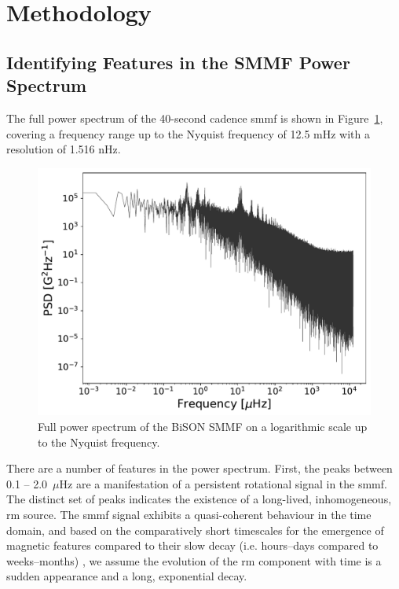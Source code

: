 \section{Methodology}\label{sec:SMMF_method}


\subsection{Identifying Features in the SMMF Power Spectrum}

The full power spectrum of the 40-second cadence \gls{smmf} is shown in Figure~\ref{fig:BiSON_FT_full}, covering a frequency range up to the Nyquist frequency of 12.5 mHz with a resolution of 1.516 nHz. 

\begin{figure}[ht!]
	\centering
	\includegraphics[width=\columnwidth]{BiSON_SMMF_FT_full.pdf}
	\caption{Full power spectrum of the BiSON SMMF on a logarithmic scale up to the Nyquist frequency.}
	\label{fig:BiSON_FT_full}
\end{figure}

There are a number of features in the power spectrum. First, the peaks between 0.1 -- 2.0~$\mu\mathrm{Hz}$ are a manifestation of a persistent rotational signal in the \gls{smmf}. The distinct set of peaks indicates the existence of a long-lived, inhomogeneous, \gls{rm} source. The \gls{smmf} signal exhibits a quasi-coherent behaviour in the time domain, and based on the comparatively short timescales for the emergence of magnetic features compared to their slow decay (i.e. hours--days compared to weeks--months) \citep{zwaan_solar_1981, harvey_properties_1993, hathaway_sunspot_2008, dacie_evolution_2016}, we assume the evolution of the \gls{rm} component with time is a sudden appearance and a long, exponential decay.

